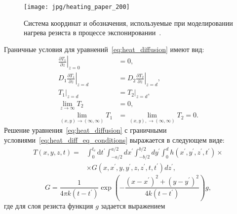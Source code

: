 \begin{figure}
	\centering
	\texttt{[image: jpg/heating\_paper\_200]}
	\caption{Система координат и обозначения, используемые при моделировании нагрева резиста в процессе экспонировании~\cite{Cui_heating}.}
	\label{fig:heating_paper}
\end{figure}
\noindent Граничные условия для уравнений~\ref{eq:heat_diffusion} имеют вид:
\begin{equation} \label{eq:heat_diff_eq_conditions}
	\begin{aligned}
		\left.\frac{\partial T_1}{\partial z}\right|_{z=0} &= 0, \\
		D_1 \left.\frac{\partial T_1}{\partial z}\right|_{z=d} &= D_2 \left.\frac{\partial T_2}{\partial z}\right|_{z=d}, \\
		\left.T_1\right|_{z=d} &= \left.T_2\right|_{z=d}, \\
		\lim _{z \rightarrow \infty} T_2 &= 0, \\
		\lim _{(x,y) \rightarrow (\infty, \infty)} T_1 &= \lim _{(x,y), \rightarrow (\infty, \infty)} T_2 = 0.
	\end{aligned}
\end{equation}
Решение уравнения~\ref{eq:heat_diffusion} с граничными условиями~\ref{eq:heat_diff_eq_conditions} выражается в следующем виде:
\begin{equation} \label{eq:heat_final_equation}
	\begin{split}
		T(x, y, z, t) = & \int_0^{t_\mathrm{e}} \mathrm{d} t^{\prime} \int_{-a / 2}^{a / 2} d x^{\prime} \int_{-b / 2}^{b / 2} d y^{\prime} \int_0^d h\left(x^{\prime}, y^{\prime}, z^{\prime}, t^{\prime}\right) \times \\ & \times G\left(x, x^{\prime}, y, y^{\prime}, z, z^{\prime}, t, t^{\prime}\right) d z^{\prime},
	\end{split}
\end{equation}
\begin{equation}
	G=\frac{1}{4 \pi k\left(t-t^{\prime}\right)} \exp \left(-\frac{\left(x-x^{\prime}\right)^2+\left(y-y^{\prime}\right)^2}{4 k\left(t-t^{\prime}\right)}\right) g,
\end{equation}
где для слоя резиста функция $g$ задается выражением
